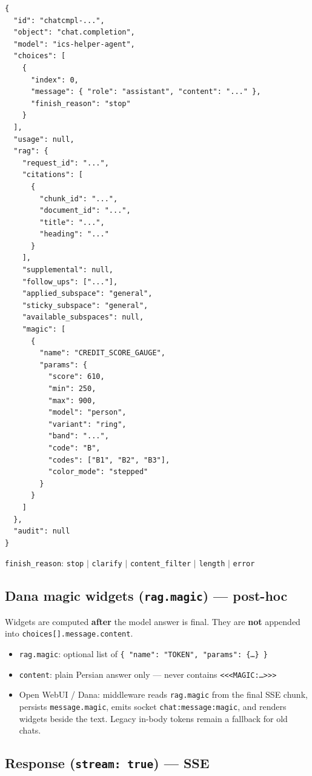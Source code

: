\documentclass[11pt,a4paper]{article}
\begin{document}
\begin{lstlisting}
{
  "id": "chatcmpl-...",
  "object": "chat.completion",
  "model": "ics-helper-agent",
  "choices": [
    {
      "index": 0,
      "message": { "role": "assistant", "content": "..." },
      "finish_reason": "stop"
    }
  ],
  "usage": null,
  "rag": {
    "request_id": "...",
    "citations": [
      {
        "chunk_id": "...",
        "document_id": "...",
        "title": "...",
        "heading": "..."
      }
    ],
    "supplemental": null,
    "follow_ups": ["..."],
    "applied_subspace": "general",
    "sticky_subspace": "general",
    "available_subspaces": null,
    "magic": [
      {
        "name": "CREDIT_SCORE_GAUGE",
        "params": {
          "score": 610,
          "min": 250,
          "max": 900,
          "model": "person",
          "variant": "ring",
          "band": "...",
          "code": "B",
          "codes": ["B1", "B2", "B3"],
          "color_mode": "stepped"
        }
      }
    ]
  },
  "audit": null
}
\end{lstlisting}

\noindent\texttt{finish_reason}: \texttt{stop} $|$ \texttt{clarify} $|$ \texttt{content_filter} $|$ \texttt{length} $|$ \texttt{error}

\subsection{Dana magic widgets (\texttt{rag.magic}) --- post-hoc}

Widgets are computed \textbf{after} the model answer is final. They are
\textbf{not} appended into \texttt{choices[].message.content}.

\begin{itemize}
  \item \texttt{rag.magic}: optional list of \texttt{\{ "name": "TOKEN", "params": \{\ldots\} \}}
  \item \texttt{content}: plain Persian answer only --- never contains \texttt{<<<MAGIC:\ldots>>>}
  \item Open WebUI / Dana: middleware reads \texttt{rag.magic} from the final SSE
    chunk, persists \texttt{message.magic}, emits socket \texttt{chat:message:magic},
    and renders widgets beside the text. Legacy in-body tokens remain a fallback
    for old chats.
\end{itemize}

\subsection{Response (\texttt{stream: true}) --- SSE}
\end{document}
